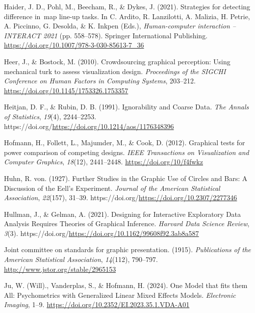 \documentclass[
  10pt,
]{article}
\newlength{\cslhangindent}
\newenvironment{CSLReferences}[2] %
 {\begin{list}{}{%
  \setlength{\itemindent}{0pt}
  \setlength{\leftmargin}{0pt}
  \setlength{\parsep}{0pt}
  \ifodd #1
   \setlength{\leftmargin}{\cslhangindent}
   \setlength{\itemindent}{-1\cslhangindent}
  \fi
  \setlength{\itemsep}{#2\baselineskip}}}
 {\end{list}}
\begin{document}
\begin{CSLReferences}{1}{0}
Haider, J. D., Pohl, M., Beecham, R., \& Dykes, J. (2021). Strategies
for detecting difference in~map line-up tasks. In C. Ardito, R.
Lanzilotti, A. Malizia, H. Petrie, A. Piccinno, G. Desolda, \& K. Inkpen
(Eds.), \emph{Human-computer interaction -- {INTERACT} 2021} (pp.
558--578). Springer International Publishing.
\url{https://doi.org/10.1007/978-3-030-85613-7_36}

Heer, J., \& Bostock, M. (2010). Crowdsourcing graphical perception:
Using mechanical turk to assess visualization design. \emph{Proceedings
of the {SIGCHI} Conference on Human Factors in Computing Systems},
203--212. \url{https://doi.org/10.1145/1753326.1753357}

Heitjan, D. F., \& Rubin, D. B. (1991). Ignorability and {Coarse}
{Data}. \emph{The Annals of Statistics}, \emph{19}(4), 2244--2253.
https://doi.org/\url{https://doi.org/10.1214/aos/1176348396}

Hofmann, H., Follett, L., Majumder, M., \& Cook, D. (2012). Graphical
tests for power comparison of competing designs. \emph{IEEE Transactions
on Visualization and Computer Graphics}, \emph{18}(12), 2441--2448.
\url{https://doi.org/10/f4fwkz}

Huhn, R. von. (1927). Further {Studies} in the {Graphic} {Use} of
{Circles} and {Bars}: {A} {Discussion} of the {Eell}'s {Experiment}.
\emph{Journal of the American Statistical Association}, \emph{22}(157),
31--39. https://doi.org/\url{https://doi.org/10.2307/2277346}

Hullman, J., \& Gelman, A. (2021). Designing for {Interactive}
{Exploratory} {Data} {Analysis} {Requires} {Theories} of {Graphical}
{Inference}. \emph{Harvard Data Science Review}, \emph{3}(3).
https://doi.org/\url{https://doi.org/10.1162/99608f92.3ab8a587}

Joint committee on standards for graphic presentation. (1915).
\emph{Publications of the American Statistical Association},
\emph{14}(112), 790--797. \url{http://www.jstor.org/stable/2965153}

Ju, W. (Will)., Vanderplas, S., \& Hofmann, H. (2024). One {Model} that
fits them {All}: {Psychometrics} with {Generalized Linear Mixed Effects
Models}. \emph{Electronic Imaging}, 1--9.
\url{https://doi.org/10.2352/EI.2023.35.1.VDA-A01}


\end{CSLReferences}
\end{document}
